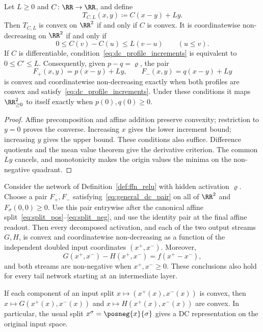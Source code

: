 \begin{proposition}\label{prop:dc_profile_lift}
Let $L\ge0$ and $C\colon\RR\to\RR$, and define
\begin{equation}
    T_{C,L}(x,y)\coloneqq C(x-y)+Ly.
    \label{eq:dc_profile_lift}
\end{equation}
Then $T_{C,L}$ is convex on $\RR^2$ if and only if $C$ is convex. It is coordinatewise non-decreasing on $\RR^2$ if and only if
\begin{equation}
    0\le C(v)-C(u)\le L(v-u)\qquad(u\le v).
    \label{eq:dc_profile_increments}
\end{equation}
If $C$ is differentiable, condition~\eqref{eq:dc_profile_increments} is equivalent to $0\le C'\le L$. Consequently, given $p-q=\varrho$, the pair
\begin{equation}
    F_+(x,y)=p(x-y)+Ly,
    \qquad F_-(x,y)=q(x-y)+Ly
    \label{eq:asymmetric_dc_pair}
\end{equation}
is convex and coordinatewise non-decreasing exactly when both profiles are convex and satisfy~\eqref{eq:dc_profile_increments}. Under these conditions it maps $\RR^2_{\ge0}$ to itself exactly when $p(0),q(0)\ge0$.
\end{proposition}

\begin{proof}
Affine precomposition and affine addition preserve convexity; restriction to $y=0$ proves the converse. Increasing $x$ gives the lower increment bound; increasing $y$ gives the upper bound. These conditions also suffice. Difference quotients and the mean value theorem give the derivative criterion. The common $Ly$ cancels, and monotonicity makes the origin values the minima on the non-negative quadrant.
\end{proof}

\begin{theoremenv}\label{thm:general_dc_network}
Consider the network of Definition~\ref{def:ffn_relu} with hidden activation $\varrho$. Choose a pair $F_+,F_-$ satisfying~\eqref{eq:general_dc_pair} on all of $\RR^2$ and $F_\sigma(0,0)\ge0$. Use this pair entrywise after the canonical affine split~\eqref{eq:split_pos}--\eqref{eq:split_neg}, and use the identity pair at the final affine readout. Then every decomposed activation, and each of the two output streams $G,H$, is convex and coordinatewise non-decreasing as a function of the independent doubled input coordinates $(x^+,x^-)$. Moreover,
\begin{equation}
    G(x^+,x^-)-H(x^+,x^-)=f(x^+-x^-),
    \label{eq:general_network_dc_recovery}
\end{equation}
and both streams are non-negative when $x^+,x^-\ge0$. These conclusions also hold for every tail network starting at an intermediate layer.

If each component of an input split $x\mapsto(x^+(x),x^-(x))$ is convex, then $x\mapsto G(x^+(x),x^-(x))$ and $x\mapsto H(x^+(x),x^-(x))$ are convex. In particular, the usual split $x^\sigma=\posneg{x}{\sigma}$ gives a DC representation on the original input space.
\end{theoremenv}

